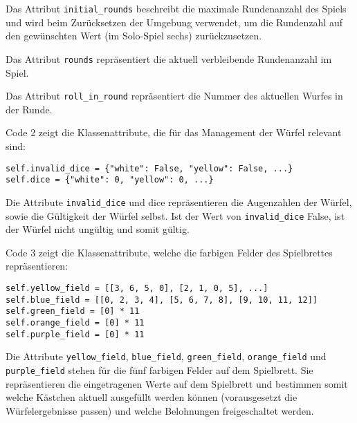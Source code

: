 Das Attribut \texttt{initial\_rounds} beschreibt die maximale Rundenanzahl des Spiels und wird beim Zurücksetzen der Umgebung verwendet, um die Rundenzahl auf den gewünschten Wert (im Solo-Spiel sechs) zurückzusetzen.

Das Attribut \texttt{rounds} repräsentiert die aktuell verbleibende Rundenanzahl im Spiel.

Das Attribut \texttt{roll\_in\_round} repräsentiert die Nummer des aktuellen Wurfes in der Runde.\\

\begin{minipage}{\linewidth}
Code 2 zeigt die Klassenattribute, die für das Management der Würfel relevant sind:
\vspace{0.5cm}
\begin{lstlisting}[caption={Klassenattribute für Würfel}, basicstyle=\ttfamily]
self.invalid_dice = {"white": False, "yellow": False, ...}
self.dice = {"white": 0, "yellow": 0, ...}
\end{lstlisting}
\end{minipage}

Die Attribute \texttt{invalid\_dice} und dice repräsentieren die Augenzahlen der Würfel, sowie die Gültigkeit der Würfel selbst. Ist der Wert von \texttt{invalid\_dice} False, ist der Würfel nicht ungültig und somit gültig.\\

\begin{minipage}{\linewidth}
Code 3 zeigt die Klassenattribute, welche die farbigen Felder des Spielbrettes repräsentieren:
\vspace{0.5cm}
\begin{lstlisting}[caption={Klassenattribute für die farbigen Felder des Spiels}, basicstyle=\ttfamily]
self.yellow_field = [[3, 6, 5, 0], [2, 1, 0, 5], ...]
self.blue_field = [[0, 2, 3, 4], [5, 6, 7, 8], [9, 10, 11, 12]]
self.green_field = [0] * 11
self.orange_field = [0] * 11
self.purple_field = [0] * 11
\end{lstlisting}
\end{minipage}

Die Attribute \texttt{yellow\_field}, \texttt{blue\_field}, \texttt{green\_field}, \texttt{orange\_field} und \texttt{purple\_field} stehen für die fünf farbigen Felder auf dem Spielbrett. Sie repräsentieren die eingetragenen Werte auf dem Spielbrett und bestimmen somit welche Kästchen aktuell ausgefüllt werden können (vorausgesetzt die Würfelergebnisse passen) und welche Belohnungen freigeschaltet werden.\\

